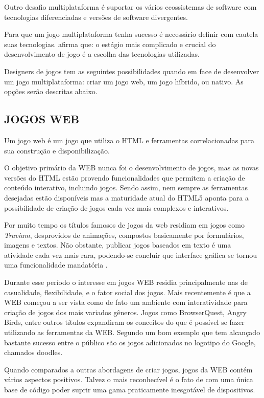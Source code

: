 Outro desafio multiplataforma é suportar os vários ecossistemas
de software com tecnologias diferenciadas e versões de software
divergentes.

Para que um jogo multiplataforma tenha sucesso é necessário definir
com cautela suas tecnologias. \cite{html5mostwanted} afirma que: o
estágio mais complicado e crucial do desenvolvimento de jogo é a
escolha das tecnologias utilizadas.

Designers de jogos tem as seguintes possibilidades quando em face
de desenvolver um jogo multiplataforma: criar um jogo web, um jogo
híbrido, ou nativo. As opções serão descritas abaixo.

\subsection{JOGOS WEB}

Um jogo web é um jogo que utiliza o HTML e ferramentas correlacionadas
para sua construção e disponibilização.

O objetivo primário da WEB nunca foi o desenvolvimento de
jogos, mas as novas versões do HTML estão provendo funcionalidades
que permitem a criação de conteúdo interativo, incluindo jogos. Sendo 
assim, nem sempre as ferramentas desejadas estão disponíveis mas a 
maturidade atual do HTML5 aponta para a possibilidade de criação de 
jogos cada vez mais complexos e interativos.

Por muito tempo os títulos famosos de jogos da web residiam em jogos
como \textit{Traviam}, desprovidos de animações, compostos basicamente
por formulários, imagens e textos. Não obstante, publicar jogos
baseados em texto é uma atividade cada vez mais rara, podendo-se
concluir que interface gráfica se tornou uma funcionalidade mandatória
\autocite{browserGamesTechnologyAndFuture}.

Durante esse período o interesse em jogos WEB residia principalmente
nas de casualidade, flexibilidade, e o fator social dos jogos.
Mais recentemente é que a WEB começou a ser vista como de fato um
ambiente com interatividade para criação de jogos dos mais variados
gêneros. Jogos como BrowserQuest, Angry Birds, entre outros
títulos expandiram os conceitos do que é possível se fazer utilizando
as ferramentas da WEB. Segundo \cite[pp. 28]{gwt} um bom exemplo
que tem alcançado bastante sucesso entre o público são os jogos
adicionados no logotipo do Google, chamados doodles.

Quando comparados a outras abordagens de criar jogos, jogos da WEB
contém vários aspectos positivos. Talvez o mais reconhecível
é o fato de com uma única base de código poder suprir uma gama
praticamente inesgotável de dispositivos. 

